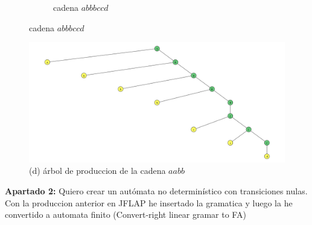 \documentclass{article}
\begin{document}
\begin{figure}[!h]
\begin{subfigure}[b]{0.25\textwidth}
                    \caption{cadena $abbbccd$}
                    \label{fig:label3}
                \end{subfigure}
                \label{fig:matrix1}
            \end{figure}


        \newpage


        \begin{figure}[!h]
            \centering
            \includegraphics[width=\textwidth]{./Imagenes/image6.png}
            \caption*{ (d) árbol de produccion de la cadena  $aabb$}
            \label{fig:label4}
        \end{figure}
        \vspace{\baselineskip} %


        \textbf{Apartado 2:}
        Quiero crear un autómata no determinístico con transiciones nulas.
        Con la produccion anterior en JFLAP he insertado la gramatica y luego la he convertido a automata finito (Convert-right linear gramar to FA)
        \vspace{\baselineskip} %
\end{document}
